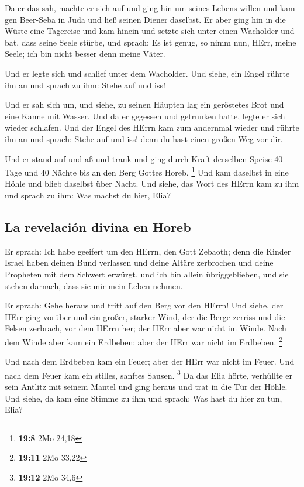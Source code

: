  Da er das sah, machte er sich auf und ging hin um seines
Lebens willen und kam gen Beer-Seba in Juda und ließ seinen Diener
daselbst.  Er aber ging hin in die Wüste eine Tagereise
und kam hinein und setzte sich unter einen Wacholder und bat, dass seine
Seele stürbe, und sprach: Es ist genug, so nimm nun, HErr, meine Seele;
ich bin nicht besser denn meine Väter.

 Und er legte sich und schlief unter dem Wacholder. Und
siehe, ein Engel rührte ihn an und sprach zu ihm: Stehe auf und iss!

 Und er sah sich um, und siehe, zu seinen Häupten lag ein
geröstetes Brot und eine Kanne mit Wasser. Und da er gegessen und
getrunken hatte, legte er sich wieder schlafen.  Und der
Engel des HErrn kam zum andernmal wieder und rührte ihn an und sprach:
Stehe auf und iss! denn du hast einen großen Weg vor dir.

 Und er stand auf und aß und trank und ging durch Kraft
derselben Speise 40 Tage und 40 Nächte bis an den Berg Gottes Horeb.
\footnote{\textbf{19:8} 2Mo 24,18}  Und kam daselbst in
eine Höhle und blieb daselbst über Nacht. Und siehe, das Wort des HErrn
kam zu ihm und sprach zu ihm: Was machst du hier, Elia?

\hypertarget{la-revelaciuxf3n-divina-en-horeb}{%
\subsection{La revelación divina en
Horeb}\label{la-revelaciuxf3n-divina-en-horeb}}

 Er sprach: Ich habe geeifert um den HErrn, den Gott
Zebaoth; denn die Kinder Israel haben deinen Bund verlassen und deine
Altäre zerbrochen und deine Propheten mit dem Schwert erwürgt, und ich
bin allein übriggeblieben, und sie stehen darnach, dass sie mir mein
Leben nehmen.

 Er sprach: Gehe heraus und tritt auf den Berg vor den
HErrn! Und siehe, der HErr ging vorüber und ein großer, starker Wind,
der die Berge zerriss und die Felsen zerbrach, vor dem HErrn her; der
HErr aber war nicht im Winde. Nach dem Winde aber kam ein Erdbeben; aber
der HErr war nicht im Erdbeben. \footnote{\textbf{19:11} 2Mo 33,22}

 Und nach dem Erdbeben kam ein Feuer; aber der HErr war
nicht im Feuer. Und nach dem Feuer kam ein stilles, sanftes Sausen.
\footnote{\textbf{19:12} 2Mo 34,6}  Da das Elia hörte,
verhüllte er sein Antlitz mit seinem Mantel und ging heraus und trat in
die Tür der Höhle. Und siehe, da kam eine Stimme zu ihm und sprach: Was
hast du hier zu tun, Elia?

